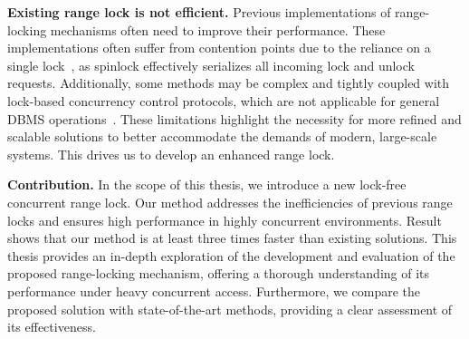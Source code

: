 \textbf{Existing range lock is not efficient.}
Previous implementations of range-locking mechanisms often need to improve their performance. 
These implementations often suffer from contention points due to the reliance on a single lock~\parencite{linuxRangeLockImpl2013, song2013parallelizing}, as spinlock effectively serializes all incoming lock and unlock requests. 
Additionally, some methods may be complex and tightly coupled with lock-based concurrency control protocols, which are not applicable for general DBMS operations~\parencite{graefe2007hierarchical, andy2022database}. 
These limitations highlight the necessity for more refined and scalable solutions to better accommodate the demands of modern, large-scale systems. This drives us to develop an enhanced range lock.

\textbf{Contribution.} In the scope of this thesis, we introduce a new lock-free concurrent range lock. 
Our method addresses the inefficiencies of previous range locks and ensures high performance in highly concurrent environments. 
Result shows that our method is at least three times faster than existing solutions. 
This thesis provides an in-depth exploration of the development and evaluation of the proposed range-locking mechanism, offering a thorough understanding of its performance under heavy concurrent access. 
Furthermore, we compare the proposed solution with state-of-the-art methods, providing a clear assessment of its effectiveness.